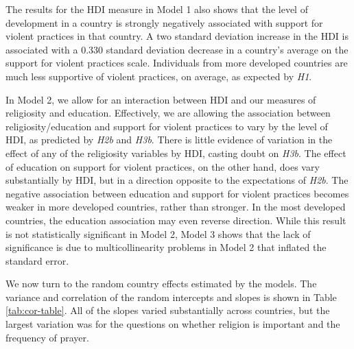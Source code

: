 \documentclass[10pt,letterpaper]{article}
\begin{document}
The results for the HDI measure in Model 1 also shows that the level of development in a country is strongly negatively associated with support for violent practices in that country. A two standard deviation increase in the HDI is associated with a 0.330 standard deviation decrease in a country's average on the support for violent practices scale. Individuals from more developed countries are much less supportive of violent practices, on average, as expected by \emph{H1}.

In Model 2, we allow for an interaction between HDI and our measures of religiosity and education. Effectively, we are allowing the association between religiosity/education and support for violent practices to vary by the level of HDI, as predicted by \emph{H2b} and \emph{H3b}. There is little evidence of variation in the effect of any of the religiosity variables by HDI, casting doubt on \emph{H3b}. The effect of education on support for violent practices, on the other hand, does vary substantially by HDI, but in a direction opposite to the expectations of \emph{H2b}. The negative association between education and support for violent practices becomes weaker in more developed countries, rather than stronger. In the most developed countries, the education association may even reverse direction. While this result is not statistically significant in Model 2, Model 3 shows that the lack of significance is due to multicollinearity problems in Model 2 that inflated the standard error.

We now turn to the random country effects estimated by the models. The variance and correlation of the random intercepts and slopes is shown in Table \ref{tab:cor-table}. All of the slopes varied substantially across countries, but the largest variation was for the questions on whether religion is important and the frequency of prayer.
\end{document}
